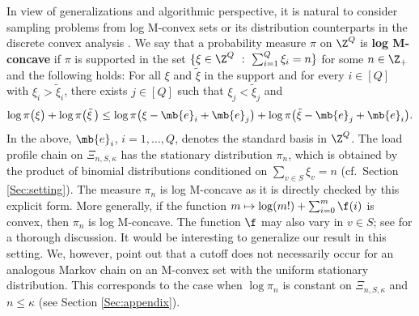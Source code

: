 \documentclass[12pt, reqno]{amsart}
\begin{document}
In view of generalizations and algorithmic perspective,
it is natural to consider sampling problems from log M-convex sets or its distribution counterparts in the discrete convex analysis \cite{Murota}.
We say that a probability measure $\pi$ on $\Z^Q$ is {\bf log M-concave} if $\pi$ is supported in the set 
$\{\xi \in \Z^Q \ : \ \sum_{i=1}^Q\xi_i=n\}$ for some $n \in \Z_+$ and the following holds:
For all $\xi$ and $\tilde \xi$ in the support and for every $i \in [Q]$ with $\xi_i>\tilde \xi_i$,
there exists $j \in [Q]$ such that $\xi_j<\tilde \xi_j$ and
\[
\log \pi\big(\xi\big)+\log \pi\big(\tilde \xi\,\big)\le \log \pi\big(\xi-\mb{e}_i+\mb{e}_j\big)+\log \pi\big(\tilde \xi-\mb{e}_j+\mb{e}_i\big).
\]
In the above, $\mb{e}_i$, $i=1, \dots, Q$, denotes the standard basis in $\Z^Q$.
The load profile chain on $\Xi_{n, S, \kappa}$ has the stationary distribution $\pi_n$,
which is obtained by the product of binomial distributions conditioned on $\sum_{v \in S}\xi_v=n$ (cf.\ Section \ref{Sec:setting}).
The measure $\pi_n$ is log M-concave as it is directly checked by this explicit form.
More generally,
if the function $m \mapsto \log (m!)+ \sum_{i=0}^m\f(i)$ is convex,
then $\pi_n$ is log M-concave.
The function $\f$ may also vary in $v \in S$;
see \cite[Example 6.3, Chapter 6]{Murota} for a thorough discussion.
It would be interesting to generalize our result in this setting.
We, however, point out that a cutoff does not necessarily occur for an analogous Markov chain on an M-convex set with the uniform stationary distribution.
This corresponds to the case when $\log \pi_n$ is constant on $\Xi_{n, S, \kappa}$ and $n \le \kappa$ (see Section \ref{Sec:appendix}).
\end{document}
